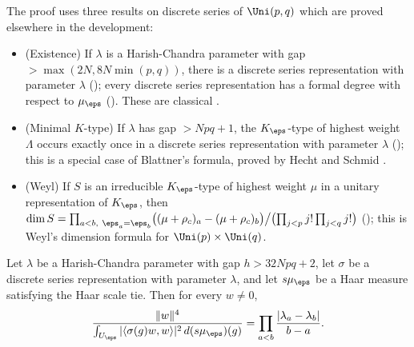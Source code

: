 The proof uses three results on discrete series of $\Uni(p,q)$ which are proved elsewhere in the development:
\begin{itemize}
\item (Existence) If $\lambda$ is a Harish-Chandra parameter with gap $>\max(2N,8N\min(p,q))$, there is a discrete series
representation with parameter $\lambda$ ();
every discrete series representation has a formal degree with respect to $\mu_\eps$
(). These are classical
\cite{HarishChandra1966}.
\item (Minimal $K$-type) If $\lambda$ has gap $>Npq+1$, the $K_\eps$-type of highest weight $\Lambda$ occurs exactly once in
a discrete series representation with parameter $\lambda$
(); this is a special case of
Blattner's formula, proved by Hecht and Schmid \cite{HechtSchmid1975}.
\item (Weyl) If $S$ is an irreducible $K_\eps$-type of highest weight $\mu$ in a unitary representation of $K_\eps$, then
$\dim S=\prod_{a<b,\ \eps_a=\eps_b}\bigl((\mu+\rho_c)_a-(\mu+\rho_c)_b\bigr)\big/\bigl(\prod_{j<p}j!\prod_{j<q}j!\bigr)$
(); this is Weyl's dimension formula for $\Uni(p)\times\Uni(q)$.
\end{itemize}

\begin{lemma}\label{pf:sh-curv:hc}
Let $\lambda$ be a Harish-Chandra parameter with gap $h>32Npq+2$, let $\sigma$ be a discrete series representation with
parameter $\lambda$, and let $s\mu_\eps$ be a Haar measure satisfying the Haar scale tie. Then for every $w\ne0$,
\[
\frac{\|w\|^4}{\int_{U_\eps}|\langle\sigma(g)w,w\rangle|^2\,d(s\mu_\eps)(g)}=\prod_{a<b}\frac{|\lambda_a-\lambda_b|}{b-a}.
\]
\end{lemma}

